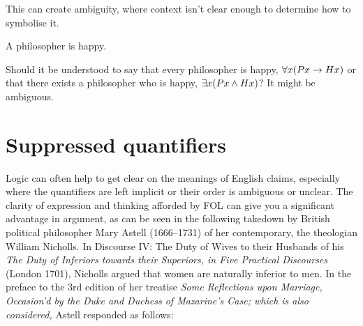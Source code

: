 		
			This can create ambiguity, where context isn't clear enough to determine how to symbolise it. 
			\begin{samplesent}
				\item A philosopher is happy. 
			\end{samplesent}
			Should it be understood to say that every philosopher is happy, $\forall x(Px\rightarrow Hx)$ or that there exists a philosopher who is happy, $\exists x(Px\mathbin{\wedge} Hx)$? It might be ambiguous. 

			
			\section{Suppressed quantifiers}
			
			Logic can often help to get clear on the meanings of English claims,
			especially where the quantifiers are left implicit or their order is
			ambiguous or unclear. The clarity of expression and thinking afforded
			by FOL can give you a significant advantage in argument, as can be
			seen in the following takedown by British political philosopher Mary
			Astell (1666--1731) of her contemporary, the theologian William
			Nicholls. In Discourse IV: The Duty of Wives to their Husbands of his
			\textit{The Duty of Inferiors towards their Superiors, in Five
				Practical Discourses} (London 1701), Nicholls argued that women are
			naturally inferior to men. In the preface to the 3rd edition of her
			treatise \emph{Some Reflections upon Marriage, Occasion'd by the Duke
				and Duchess of Mazarine's Case; which is also considered,} Astell
			responded as follows:
